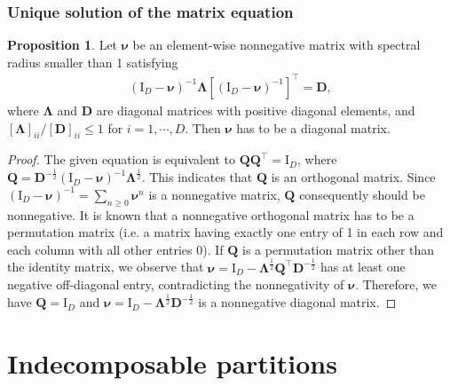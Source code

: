 \documentclass[11pt]{article}
\numberwithin{equation}{section}
\theoremstyle{plain}
\theoremstyle{definition}
\theoremstyle{definition}
\theoremstyle{assumption}
\theoremstyle{proposition}
\newtheorem{proposition}{Proposition}[section]
\theoremstyle{proposition}
\theoremstyle{example}
\theoremstyle{lemma}
\theoremstyle{theorem}
\theoremstyle{remark}
\begin{document}
\subsubsection{Unique solution of the matrix equation}\label{proof_uniq_mat_eq_sect}
\begin{proposition}\label{uniq_mat_eq_proposition}
Let $\boldsymbol{\nu}$ be an element-wise nonnegative matrix with spectral radius smaller than 1 satisfying 
\begin{align*}
(\boldsymbol{\mathrm{I}}_D - \boldsymbol{\nu})^{-1}\boldsymbol{\Lambda}[(\boldsymbol{\mathrm{I}}_D - \boldsymbol{\nu})^{-1}]^{\top} = \boldsymbol{D},
\end{align*}
where $\boldsymbol{\Lambda}$ and $\boldsymbol{D}$ are diagonal matrices with positive diagonal elements, and $[\boldsymbol{\Lambda}]_{ii}/[\boldsymbol{D}]_{ii} \leqslant 1$ for $i=1,\cdots,D$. Then $\boldsymbol{\nu}$ has to be a diagonal matrix.
\begin{proof}
The given equation is equivalent to $\boldsymbol{Q}\boldsymbol{Q}^{\top} = \boldsymbol{\mathrm{I}}_D$, where $\boldsymbol{Q}=\boldsymbol{D}^{-\frac{1}{2}}(\boldsymbol{\mathrm{I}}_D - \boldsymbol{\nu})^{-1}\boldsymbol{\Lambda}^{\frac{1}{2}}$. This indicates that $\boldsymbol{Q}$ is an orthogonal matrix. Since $(\boldsymbol{\mathrm{I}}_D - \boldsymbol{\nu})^{-1}=\sum_{n\geqslant0}\boldsymbol{\nu}^n$ is a nonnegative matrix, $\boldsymbol{Q}$ consequently should be nonnegative. It is known that a nonnegative orthogonal matrix has to be a permutation matrix (i.e. a matrix having exactly one entry of 1 in each row and each column with all other entries 0). If $\boldsymbol{Q}$ is a permutation matrix other than the identity matrix, we observe that $\boldsymbol{\nu} = \boldsymbol{\mathrm{I}}_D - \boldsymbol{\Lambda}^{\frac{1}{2}}\boldsymbol{Q}^{\top}\boldsymbol{D}^{-\frac{1}{2}}$ has at least one negative off-diagonal entry, contradicting the nonnegativity of $\boldsymbol{\nu}$. Therefore, we have $\boldsymbol{Q}=\boldsymbol{\mathrm{I}}_D$ and $\boldsymbol{\nu} = \boldsymbol{\mathrm{I}}_D - \boldsymbol{\Lambda}^{\frac{1}{2}}\boldsymbol{D}^{-\frac{1}{2}}$ is a nonnegative diagonal matrix.
\end{proof}
\end{proposition}

\section{Indecomposable partitions}\label{indecomposable_partition_sect}
\end{document}
